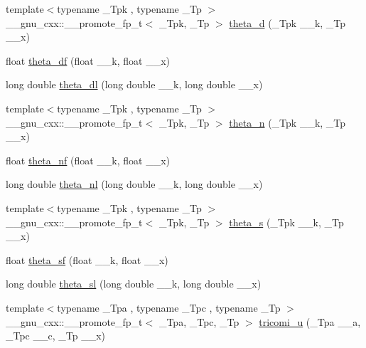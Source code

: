 \begin{DoxyCompactItemize}
{\footnotesize template$<$typename \+\_\+\+Tpk , typename \+\_\+\+Tp $>$ }\\\+\_\+\+\_\+gnu\+\_\+cxx\+::\+\_\+\+\_\+promote\+\_\+fp\+\_\+t$<$ \+\_\+\+Tpk, \+\_\+\+Tp $>$ \hyperlink{group__gnu__math__spec__func_ga72e083b0e6457c928e31c590b22e728c}{theta\+\_\+d} (\+\_\+\+Tpk \+\_\+\+\_\+k, \+\_\+\+Tp \+\_\+\+\_\+x)
\item 
float \hyperlink{group__gnu__math__spec__func_gad2dc6fcaf54d25cbfaad082623941118}{theta\+\_\+df} (float \+\_\+\+\_\+k, float \+\_\+\+\_\+x)
\item 
long double \hyperlink{group__gnu__math__spec__func_gacce4474168b9638ebeaad1c7b351fa04}{theta\+\_\+dl} (long double \+\_\+\+\_\+k, long double \+\_\+\+\_\+x)
\item 
{\footnotesize template$<$typename \+\_\+\+Tpk , typename \+\_\+\+Tp $>$ }\\\+\_\+\+\_\+gnu\+\_\+cxx\+::\+\_\+\+\_\+promote\+\_\+fp\+\_\+t$<$ \+\_\+\+Tpk, \+\_\+\+Tp $>$ \hyperlink{group__gnu__math__spec__func_ga42cbac5ad88b02d05e2e615ffc4375f9}{theta\+\_\+n} (\+\_\+\+Tpk \+\_\+\+\_\+k, \+\_\+\+Tp \+\_\+\+\_\+x)
\item 
float \hyperlink{group__gnu__math__spec__func_ga5298a95e02bd909d55e59c1f2a0b51f8}{theta\+\_\+nf} (float \+\_\+\+\_\+k, float \+\_\+\+\_\+x)
\item 
long double \hyperlink{group__gnu__math__spec__func_ga907f6c147387d55d2dfccbc58d1f1bc5}{theta\+\_\+nl} (long double \+\_\+\+\_\+k, long double \+\_\+\+\_\+x)
\item 
{\footnotesize template$<$typename \+\_\+\+Tpk , typename \+\_\+\+Tp $>$ }\\\+\_\+\+\_\+gnu\+\_\+cxx\+::\+\_\+\+\_\+promote\+\_\+fp\+\_\+t$<$ \+\_\+\+Tpk, \+\_\+\+Tp $>$ \hyperlink{group__gnu__math__spec__func_gad224ed8fcc65152f2af9e52a80bfad8a}{theta\+\_\+s} (\+\_\+\+Tpk \+\_\+\+\_\+k, \+\_\+\+Tp \+\_\+\+\_\+x)
\item 
float \hyperlink{group__gnu__math__spec__func_ga5e69cf30c9a4cc057accc43e8c4bf7a3}{theta\+\_\+sf} (float \+\_\+\+\_\+k, float \+\_\+\+\_\+x)
\item 
long double \hyperlink{group__gnu__math__spec__func_gac574077067a4e7b24a0a9ff2d537d885}{theta\+\_\+sl} (long double \+\_\+\+\_\+k, long double \+\_\+\+\_\+x)
\item 
{\footnotesize template$<$typename \+\_\+\+Tpa , typename \+\_\+\+Tpc , typename \+\_\+\+Tp $>$ }\\\+\_\+\+\_\+gnu\+\_\+cxx\+::\+\_\+\+\_\+promote\+\_\+fp\+\_\+t$<$ \+\_\+\+Tpa, \+\_\+\+Tpc, \+\_\+\+Tp $>$ \hyperlink{group__gnu__math__spec__func_gaa1fda5b87a8c44debac679331bebfb11}{tricomi\+\_\+u} (\+\_\+\+Tpa \+\_\+\+\_\+a, \+\_\+\+Tpc \+\_\+\+\_\+c, \+\_\+\+Tp \+\_\+\+\_\+x)

\end{DoxyCompactItemize}
